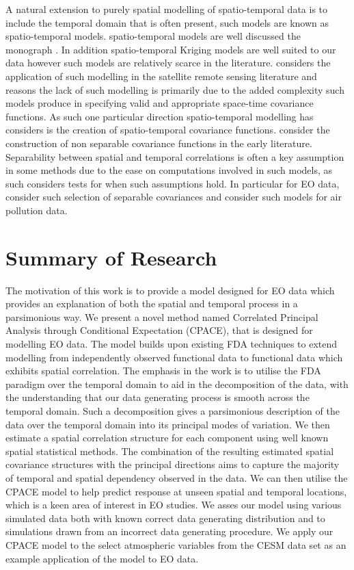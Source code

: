 A natural extension to purely spatial modelling of spatio-temporal data is to include the temporal domain that is often present, such models are known as spatio-temporal models. spatio-temporal models are well discussed the monograph \cite{cressie_statistics_2011}. In addition spatio-temporal Kriging models are well suited to our data however such models are relatively scarce in the literature. \cite{militino_introduction_2018} considers the application of such modelling in the satellite remote sensing literature and reasons the lack of such modelling is primarily due to the added complexity such models produce in specifying valid and appropriate space-time covariance functions. As such one particular direction spatio-temporal modelling has considers is the creation of spatio-temporal covariance functions. \cite{cressie_classes_1999, gneiting_nonseparable_2002, iaco_nonseparable_2002} consider the construction of non separable covariance functions in the early literature. Separability between spatial and temporal correlations is often a key assumption in some methods due to the ease on computations involved in such models, as such \cite{mitchell_likelihood_2006, fuentes_testing_2006, aston_tests_2017} considers tests for when such assumptions hold. In particular for EO data, \cite{george_selecting_2015} consider such selection of separable covariances and \cite{deb_spatio-temporal_2017} consider such models for air pollution data. 

\section{\label{sec:summary_research}Summary of Research}
The motivation of this work is to provide a model designed for EO data which provides an explanation of both the spatial and temporal process in a parsimonious way. We present a novel method named Correlated Principal Analysis through Conditional Expectation (CPACE), that is designed for modelling EO data. The model builds upon existing FDA techniques to extend modelling from independently observed functional data to functional data which exhibits spatial correlation. The emphasis in the work is to utilise the FDA paradigm over the temporal domain to aid in the decomposition of the data, with the understanding that our data generating process is smooth across the temporal domain. Such a decomposition gives a parsimonious description of the data over the temporal domain into its principal modes of variation. We then estimate a spatial correlation structure for each component using well known spatial statistical methods. The combination of the resulting estimated spatial covariance structures with the principal directions aims to capture the majority of temporal and spatial dependency observed in the data. We can then utilise the CPACE model to help predict response at unseen spatial and temporal locations, which is a keen area of interest in EO studies. We asses our model using various simulated data both with known correct data generating distribution and to simulations drawn from an incorrect data generating procedure. We apply our CPACE model to the select atmospheric variables from the CESM data set as an example application of the model to EO data.

